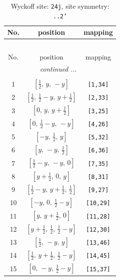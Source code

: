 \documentclass[fleqn,8pt]{jsarticle}
\begin{document}
\begin{longtable}{ccc}
\caption{Wyckoff site: {\tt 24j}, site symmetry: {\tt ..2'}}
 \\
 \hline \hline
No. & position & mapping \\ \hline \endfirsthead

\multicolumn{2}{l}{\tablename\ \thetable{}} \\
 \hline \hline
No. & position & mapping \\ \hline \endhead

 \hline \hline
\multicolumn{2}{r}{\footnotesize\it continued ...} \\ \endfoot

 \hline \hline
\multicolumn{2}{r}{} \\ \endlastfoot

1 & $\left[ \frac{1}{2},\, y,\, - y \right]$ & {\tt [1,34]} \\ \hline
2 & $\left[ \frac{1}{2},\, \frac{1}{2} - y,\, y + \frac{1}{2} \right]$ & {\tt [2,33]} \\ \hline
3 & $\left[ 0,\, y,\, y + \frac{1}{2} \right]$ & {\tt [3,25]} \\ \hline
4 & $\left[ 0,\, \frac{1}{2} - y,\, - y \right]$ & {\tt [4,26]} \\ \hline
5 & $\left[ - y,\, \frac{1}{2},\, y \right]$ & {\tt [5,32]} \\ \hline
6 & $\left[ y,\, - y,\, \frac{1}{2} \right]$ & {\tt [6,36]} \\ \hline
7 & $\left[ \frac{1}{2} - y,\, - y,\, 0 \right]$ & {\tt [7,35]} \\ \hline
8 & $\left[ y + \frac{1}{2},\, 0,\, y \right]$ & {\tt [8,31]} \\ \hline
9 & $\left[ \frac{1}{2} - y,\, y + \frac{1}{2},\, \frac{1}{2} \right]$ & {\tt [9,27]} \\ \hline
10 & $\left[ - y,\, 0,\, \frac{1}{2} - y \right]$ & {\tt [10,29]} \\ \hline
11 & $\left[ y,\, y + \frac{1}{2},\, 0 \right]$ & {\tt [11,28]} \\ \hline
12 & $\left[ y + \frac{1}{2},\, \frac{1}{2},\, \frac{1}{2} - y \right]$ & {\tt [12,30]} \\ \hline
13 & $\left[ \frac{1}{2},\, - y,\, y \right]$ & {\tt [13,46]} \\ \hline
14 & $\left[ \frac{1}{2},\, y + \frac{1}{2},\, \frac{1}{2} - y \right]$ & {\tt [14,45]} \\ \hline
15 & $\left[ 0,\, - y,\, \frac{1}{2} - y \right]$ & {\tt [15,37]} \\ \hline

\end{longtable}
\end{document}
